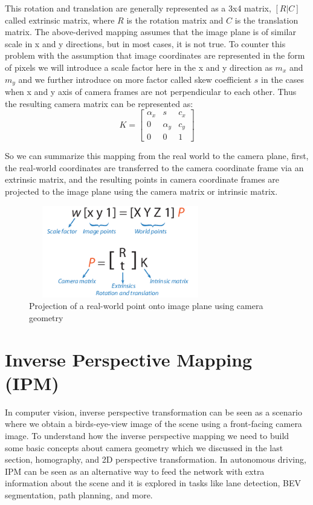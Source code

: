     This rotation and translation are generally represented as a 3x4 matrix, $[R | C ]$ called extrinsic matrix, where $R$ is the rotation matrix and $C$ is the translation matrix. The above-derived mapping assumes that the image plane is of similar scale in x and y directions, but in most cases, it is not true. To counter this problem with the assumption that image coordinates are represented in the form of pixels we will introduce a scale factor here in the x and y direction as $m_{x}$ and $m_{y}$ and we further introduce on more factor called skew coefficient $s$ in the cases when x and y axis of camera frames are not perpendicular to each other. Thus the resulting camera matrix can be represented as:
        \begin{equation}
K =  \begin{bmatrix} \alpha_{x} & s &c_{x} \\  0 & \alpha_{y} & c_{y}  \\  0  &0 &1 \end{bmatrix}
    \end{equation}
    
    So we can summarize this mapping from the real world to the camera plane, first, the real-world coordinates are transferred to the camera coordinate frame via an extrinsic matrix, and the resulting points in camera coordinate frames are projected to the image plane using the camera matrix or intrinsic matrix. 
        \begin{figure}[h]
    \centering
    \includegraphics[width=8cm, height =4cm]{images/extrinsic_intrinsic.png}
    \caption{ Projection of a real-world point onto image plane using camera geometry \cite{10.5555/861369}}
    \end{figure}
    
   
   
    \section{Inverse Perspective Mapping (IPM)}
     In computer vision, inverse perspective transformation can be seen as a scenario where we obtain a birds-eye-view image of the scene using a front-facing camera image. To understand how the inverse perspective mapping we need to build some basic concepts about camera geometry which we discussed in the last section, homography, and 2D perspective transformation. In autonomous driving, IPM can be seen as an alternative way to feed the network with extra information about the scene and it is explored in tasks like lane detection, BEV segmentation, path planning, and more. 
     
